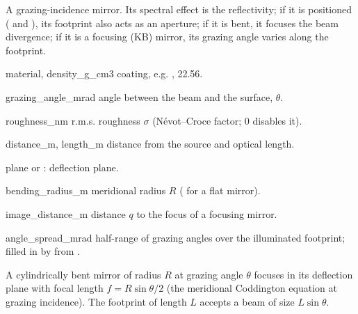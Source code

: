 A grazing-incidence mirror. Its spectral effect is the reflectivity; if it is positioned
( and ), its footprint also acts as an aperture; if it is bent,
it focuses the beam divergence; if it is a focusing (KB) mirror, its grazing angle varies
along the footprint.
\begin{args}
\item[material, density\_g\_cm3] coating, e.g. , 22.56.
\item[grazing\_angle\_mrad] angle between the beam and the surface, $\theta$.
\item[roughness\_nm] r.m.s. roughness $\sigma$ (N\'evot--Croce factor; 0 disables it).
\item[distance\_m, length\_m] distance from the source and optical length.
\item[plane]  or : deflection plane.
\item[bending\_radius\_m] meridional radius $R$ ( for a flat mirror).
\item[image\_distance\_m] distance $q$ to the focus of a focusing mirror.
\item[angle\_spread\_mrad] half-range of grazing angles over the illuminated footprint;
  filled in by  from .
\end{args}

A cylindrically bent mirror of radius $R$ at grazing angle $\theta$ focuses in its
deflection plane with focal length $f = R\sin\theta/2$ (the meridional Coddington equation
at grazing incidence). The footprint of length $L$ accepts a beam of size $L\sin\theta$.

